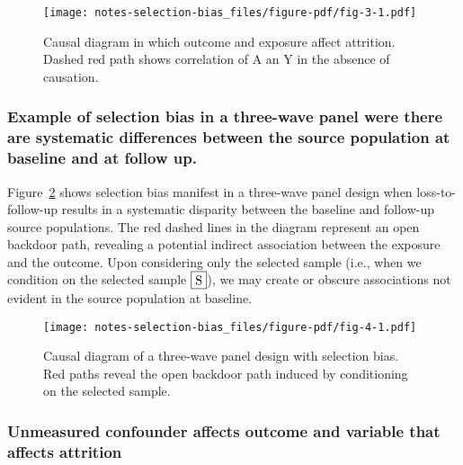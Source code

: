 \documentclass[
  singlecolumn,
  9pt]{article}
\begin{document}
\begin{figure}

{\centering \texttt{[image: notes-selection-bias\_files/figure-pdf/fig-3-1.pdf]}

}

\caption{\label{fig-3}Causal diagram in which outcome and exposure
affect attrition. Dashed red path shows correlation of A an Y in the
absence of causation.}

\end{figure}

\subsubsection{Example of selection bias in a three-wave panel were
there are systematic differences between the source population at
baseline and at follow
up.}\label{example-of-selection-bias-in-a-three-wave-panel-were-there-are-systematic-differences-between-the-source-population-at-baseline-and-at-follow-up.}

Figure~\ref{fig-4} shows selection bias manifest in a three-wave panel
design when loss-to-follow-up results in a systematic disparity between
the baseline and follow-up source populations. The red dashed lines in
the diagram represent an open backdoor path, revealing a potential
indirect association between the exposure and the outcome. Upon
considering only the selected sample (i.e., when we condition on the
selected sample \(\framebox{S}\)), we may create or obscure associations
not evident in the source population at baseline.

\begin{figure}

{\centering \texttt{[image: notes-selection-bias\_files/figure-pdf/fig-4-1.pdf]}

}

\caption{\label{fig-4}Causal diagram of a three-wave panel design with
selection bias. Red paths reveal the open backdoor path induced by
conditioning on the selected sample.}

\end{figure}

\subsubsection{Unmeasured confounder affects outcome and variable that
affects
attrition}\label{unmeasured-confounder-affects-outcome-and-variable-that-affects-attrition}
\end{document}
